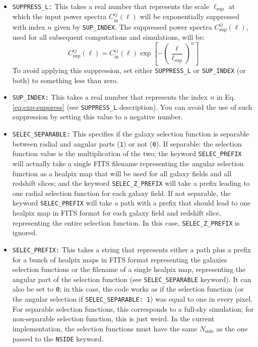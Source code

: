 \documentclass[12pt]{book} %
\newcommand{\nv}[1]{\mathrm{#1}}                 %
\begin{document}
\begin{itemize}
\item {\tt SUPPRESS\_L:} This takes a real number that represents the scale $\ell_{\nv{sup}}$ 
  at which the input power spectra $C_{\nv{in}}^{ij}(\ell)$ will be exponentially suppressed 
  with index $n$ given by {\tt SUP\_INDEX}. The suppressed power spectra $C_{\nv{sup}}^{ij}(\ell)$, 
  used for all subsequent computations and simulations, will be: 
  \begin{equation}
    C_{\nv{sup}}^{ij}(\ell) = C_{\nv{in}}^{ij}(\ell) \exp \left[ - \left(\frac{\ell}{\ell_{\nv{sup}}}\right)^n\right]
    \label{eq:exp-suppress}
  \end{equation}
  To avoid applying this suppression, set either {\tt SUPPRESS\_L} or {\tt SUP\_INDEX} (or both) 
  to something less than zero.

\item {\tt SUP\_INDEX:} This takes a real number that represents the index $n$ in Eq. 
  \ref{eq:exp-suppress} (see {\tt SUPPRESS\_L} description). You can avoid the use 
  of such suppression by setting this value to a negative number.

\item {\tt SELEC\_SEPARABLE:} This specifies if the galaxy selection function is separable between 
  radial and angular parts ({\tt 1}) or not ({\tt 0}). If separable: the selection function value is 
  the multiplication of the two; the keyword {\tt SELEC\_PREFIX} 
  will actually take a single FITS filename representing the angular selection function 
  as a {\sc healpix} map that will be used for all galaxy fields and all redshift slices; and the 
  keyword {\tt SELEC\_Z\_PREFIX} will take a prefix leading to one radial selection function for each 
  galaxy field. If not separable, the keyword {\tt SELEC\_PREFIX} will take a path with a prefix that 
  should lead to one {\sc healpix} map in FITS format for each galaxy field and redshift slice, 
  representing the entire selection function. In this case, {\tt SELEC\_Z\_PREFIX} is ignored.

\item {\tt SELEC\_PREFIX:} This takes a string that represents either a path plus a prefix for 
  a bunch of {\sc healpix} maps in FITS format representing the galaxies selection functions 
  or the filename of a single {\sc healpix} map, representing the angular 
  part of the selection function (see {\tt SELEC\_SEPARABLE} keyword). It can also be set to 
  {\tt 0}; in this case, the code works as if the selection function (or the angular selection 
  if {\tt SELEC\_SEPARABLE: 1}) was equal to one in every pixel. For separable selection functions, 
  this corresponds to a full-sky simulation; for non-separable selection function, this is just weird. 
  In the current implementation, the selection functions must have the same $N_{\nv{side}}$ as the one 
  passed to the {\tt NSIDE} keyword.


\end{itemize}
\end{document}
